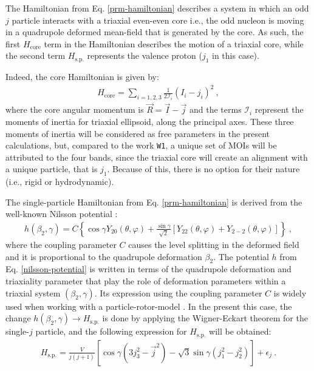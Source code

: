 \documentclass[11pt]{article}
\begin{document}
The Hamiltonian from Eq. \ref{prm-hamiltonian} describes a system in which an odd $j$ particle interacts with a triaxial even-even core i.e., the odd nucleon is moving in a quadrupole deformed mean-field that is generated by the core. As such, the first $H_\text{core}$ term in the Hamiltonian describes the motion of a triaxial core, while the second term $H_\text{s.p.}$ represents the  valence proton ($j_1$ in this case).

Indeed, the core Hamiltonian is given by:
\begin{align}
    H_\text{core}=\sum_{i=1,2,3}\frac{1}{2\mathcal{I}_i}(I_i-j_i)^2\ ,
    \label{core-hamiltonian}
\end{align}
where the core angular momentum is $\vec{R}=\vec{I}-\vec{j}$ and the terms $\mathcal{I}_i$ represent the moments of inertia for triaxial ellipsoid, along the principal axes. These three moments of inertia will be considered as free parameters in the present calculations, but, compared to the work \texttt{W1}, a unique set of MOIs will be attributed to the four bands, since the triaxial core will create an alignment with a unique particle, that is $j_1$. Because of this, there is no option for their nature (i.e., rigid or hydrodynamic).

The single-particle Hamiltonian from Eq. \ref{prm-hamiltonian} is derived from the well-known Nilsson potential \cite{meyer1975collective,wang2008description}:
\begin{align}
    h(\beta_2,\gamma)=C\left\{\cos\gamma Y_{20}(\theta,\varphi)+\frac{\sin\gamma}{\sqrt{2}}\left[Y_{22}(\theta,\varphi)+Y_{2-2}(\theta,\varphi)\right]\right\}\ ,
    \label{nilsson-potential}
\end{align}
where the coupling parameter $C$ causes the level splitting in the deformed field and it is proportional to the quadrupole deformation $\beta_2$. The potential $h$ from Eq. \ref{nilsson-potential} is written in terms of the quadrupole deformation and triaxiality parameter that play the role of deformation parameters within a triaxial system $(\beta_2,\gamma)$. Its expression using the coupling parameter $C$ is widely used when working with a particle-rotor-model \cite{peng2003description,koike2004chiral,wang2007doublet}. In the present this case, the change $h(\beta_2,\gamma)\to H_\text{s.p.}$ is done by applying the Wigner-Eckart theorem for the single-$j$ particle, and the following expression for $H_\text{s.p.}$ will be obtained:
\begin{align}
    H_\text{s.p.}=\frac{V}{j(j+1)}\left[\cos\gamma(3j_3^2-\vec{j}^2)-\sqrt{3}\sin\gamma(j_1^2-j_2^2)\right]+\epsilon_j\ .
    \label{single-particle-hamiltonian}
\end{align}
\end{document}
